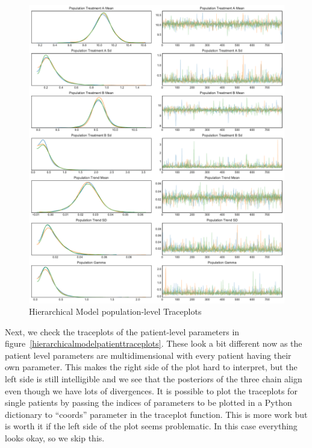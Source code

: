 \documentclass[12pt,a4paper,leqno]{report}
\theoremstyle{plain}
\theoremstyle{definition}
\theoremstyle{remark}
\begin{document}
\bigskip
\begin{figure}[H]
    \caption{Hierarchical Model population-level Traceplots}\label{hierarchicalmodelpopulationtraceplots}
    \bigskip
    \includegraphics[width=\textwidth,height=\textheight,keepaspectratio]{hierarchical_model_population_level_traceplot.pdf}
\end{figure}
\bigskip

Next, we check the traceplots of the patient-level parameters in
figure\ \ref{hierarchicalmodelpatienttraceplots}. These look a bit different now as the patient
level parameters are multidimensional with every patient having their own
parameter. This makes the right side of the plot hard to interpret, but the left side is
still intelligible and we see that the posteriors of the three chain align even though
we have lots of divergences. It is possible to plot the traceplots for single patients
by passing the indices of parameters to be plotted in a Python dictionary to ``coords''
parameter in the traceplot function. This is more work but is worth it if the
left side of the plot seems problematic. In this case everything looks okay, so we skip this.
\end{document}
